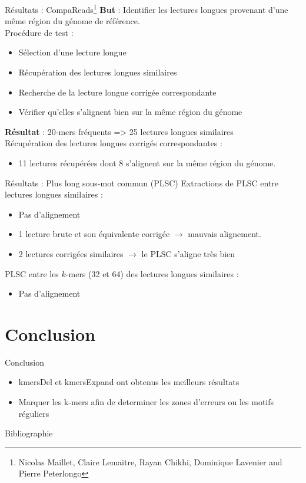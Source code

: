 \documentclass[11pt]{beamer}
\begin{document}
\begin{frame}[fragile]{Résultats : CompaReads\footnote{Nicolas Maillet, Claire Lemaitre, Rayan Chikhi, Dominique Lavenier and Pierre Peterlongo\cite{CompaReads2012}}}
  \textbf{But} : Identifier les lectures longues provenant d'une même région du génome de référence.\medskip\pause\\
  Procédure de test :\pause
  \begin{itemize}[<+-| alert@+>]
    \item Sélection d'une lecture longue
    \item Récupération des lectures longues similaires
    \item Recherche de la lecture longue corrigée correspondante
    \item Vérifier qu'elles s'alignent bien sur la même région du génome
  \end{itemize}\pause
  \textbf{Résultat} : $20$-mers fréquents => 25 lectures longues similaires\medskip\pause\\
  Récupération des lectures longues corrigés correspondantes :\\
  \begin{itemize}
    \item 11 lectures récupérées dont 8 s'alignent sur la même région du génome.
  \end{itemize}\bigskip
\end{frame}

\begin{frame}[fragile]{Résultats : Plus long sous-mot commun (PLSC)}
  Extractions de PLSC entre lectures longues similaires :\pause
  \begin{itemize}[<+-| alert@+>]
    \item Pas d'alignement
    \item 1 lecture brute et son équivalente corrigée $\rightarrow$ mauvais alignement.
    \item 2 lectures corrigées similaires $\rightarrow$ le PLSC s'aligne très bien
  \end{itemize}\pause
  PLSC entre les $k$-mers (32 et 64) des lectures longues similaires :\\
  \begin{itemize}
    \item Pas d'alignement
  \end{itemize}
\end{frame}

\section{Conclusion}
\begin{frame}{Conclusion}
  \begin{itemize}[<+-| alert@+>]
    \item kmersDel et kmersExpand ont obtenus les meilleurs résultats
    \item Marquer les k-mers afin de determiner les zones d'erreurs ou les motifs réguliers
  \end{itemize}
\end{frame}

\begin{frame}[allowframebreaks]{Bibliographie}
  
  
\end{frame}
\end{document}
